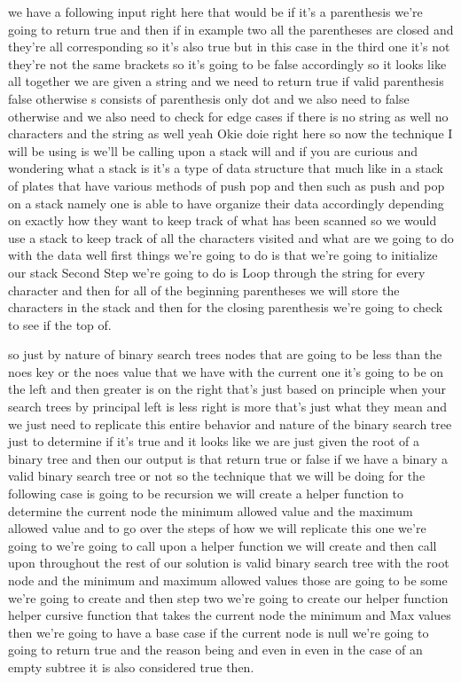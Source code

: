 \expandafter\def\csname sourceexcerpt@66\endcsname{%
we have a following input right here that would be if it's a parenthesis we're going
to return true and then if in example two all the parentheses are closed and they're
all corresponding so it's also true but in this case in the third one it's not they're
not the same brackets so it's going to be false accordingly so it looks like all
together we are given a string and we need to return true if valid parenthesis false
otherwise s consists of parenthesis only dot and we also need to false otherwise and
we also need to check for edge cases if there is no string as well no characters and
the string as well yeah Okie doie right here so now the technique I will be using is
we'll be calling upon a stack will and if you are curious and wondering what a stack
is it's a type of data structure that much like in a stack of plates that have various
methods of push pop and then such as push and pop on a stack namely one is able to
have organize their data accordingly depending on exactly how they want to keep track
of what has been scanned so we would use a stack to keep track of all the characters
visited and what are we going to do with the data well first things we're going to do
is that we're going to initialize our stack Second Step we're going to do is Loop
through the string for every character and then for all of the beginning parentheses
we will store the characters in the stack and then for the closing parenthesis we're
going to check to see if the top of.
}

\expandafter\def\csname sourceexcerpt@67\endcsname{%
so just by nature of binary search trees nodes that are going to be less than the noes
key or the noes value that we have with the current one it's going to be on the left
and then greater is on the right that's just based on principle when your search trees
by principal left is less right is more that's just what they mean and we just need to
replicate this entire behavior and nature of the binary search tree just to determine
if it's true and it looks like we are just given the root of a binary tree and then
our output is that return true or false if we have a binary a valid binary search tree
or not so the technique that we will be doing for the following case is going to be
recursion we will create a helper function to determine the current node the minimum
allowed value and the maximum allowed value and to go over the steps of how we will
replicate this one we're going to we're going to call upon a helper function we will
create and then call upon throughout the rest of our solution is valid binary search
tree with the root node and the minimum and maximum allowed values those are going to
be some we're going to create and then step two we're going to create our helper
function helper cursive function that takes the current node the minimum and Max
values then we're going to have a base case if the current node is null we're going to
going to return true and the reason being and even in even in the case of an empty
subtree it is also considered true then.
}

